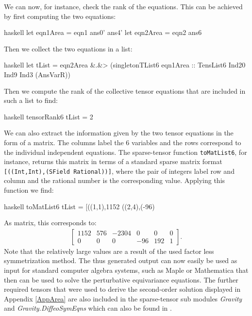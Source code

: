 We can now, for instance, check the rank of the equations. This can be achieved by first computing the two equations:
\begin{center}
\begin{cminted}{haskell}
let eqn1Area = eqn1 ans0' ans4' 
let eqn2Area = eqn2 ans6  
\end{cminted}
\end{center}
Then we collect the two equations in a list:
\begin{center}
\begin{cminted}{haskell}
let tList = eqn2Area &.&> (singletonTList6 eqn1Area ::
            TensList6 Ind20 Ind9 Ind3 (AnsVarR)) 
\end{cminted}
\end{center}
Then we compute the rank of the collective tensor equations that are included in such a list to find:
\begin{center}
\begin{cminted}{haskell}
tensorRank6 tList = 2 
\end{cminted}
\end{center}
We can also extract the information given by the two tensor equations in the form of a matrix. The columns label the 6 variables and the rows correspond to the individual independent equations. The sparse-tensor function \texttt{toMatList6}, for instance, returns this matrix in terms of a standard sparse matrix format \texttt{[((Int,Int),(SField Rational))]}, where the pair of integers label row and column and the rational number is the corresponding value. Applying this function we find:
\begin{center}
\begin{cminted}{haskell}
toMatList6 tList = [((1,1),1152 %
                   ((2,4),(-96) %
\end{cminted}
\end{center}
As matrix, this corresponds to:
\begin{align}
    \begin{bmatrix}
    1152 & 576 & -2304 & 0 & 0 & 0 \\
    0 & 0 & 0 & -96 & 192 & 1
    \end{bmatrix}.
\end{align}
Note that the relatively large values are a result of the used factor less symmetrization method. The thus generated output can now easily be used as input for standard computer algebra systems, such as Maple or Mathematica that then can be used to solve the perturbative equivariance equations.
The further required tensors that were used to derive the second-order solution displayed in Appendix \ref{AppArea}
are also included in the sparse-tensor sub modules \textit{Gravity} and \textit{Gravity.DiffeoSymEqns} which can also be found in \cite{sparse-tensor}. 
